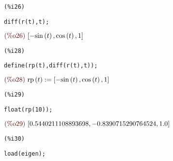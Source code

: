 \documentclass[12pt]{article}
\begin{document}
\noindent
\begin{minipage}[t]{8ex}{\color{red}\bf
\begin{verbatim}
(%i26) 
\end{verbatim}}
\end{minipage}
\begin{minipage}[t]{\textwidth}{\color{blue}
\begin{verbatim}
diff(r(t),t);
\end{verbatim}}
\end{minipage}
\begin{math}\displaystyle
\parbox{8ex}{\color{labelcolor}(\%o26) }
[-\mathrm{sin}\left( t\right) ,\mathrm{cos}\left( t\right) ,1]
\end{math}

\noindent
\begin{minipage}[t]{8ex}{\color{red}\bf
\begin{verbatim}
(%i28) 
\end{verbatim}}
\end{minipage}
\begin{minipage}[t]{\textwidth}{\color{blue}
\begin{verbatim}
define(rp(t),diff(r(t),t));
\end{verbatim}}
\end{minipage}
\begin{math}\displaystyle
\parbox{8ex}{\color{labelcolor}(\%o28) }
\mathrm{rp}\left( t\right) :=[-\mathrm{sin}\left( t\right) ,\mathrm{cos}\left( t\right) ,1]
\end{math}

\noindent
\begin{minipage}[t]{8ex}{\color{red}\bf
\begin{verbatim}
(%i29) 
\end{verbatim}}
\end{minipage}
\begin{minipage}[t]{\textwidth}{\color{blue}
\begin{verbatim}
float(rp(10));
\end{verbatim}}
\end{minipage}
\begin{math}\displaystyle
\parbox{8ex}{\color{labelcolor}(\%o29) }
[0.5440211108893698,-0.8390715290764524,1.0]
\end{math}

\noindent
\begin{minipage}[t]{8ex}{\color{red}\bf
\begin{verbatim}
(%i30) 
\end{verbatim}}
\end{minipage}
\begin{minipage}[t]{\textwidth}{\color{blue}
\begin{verbatim}
load(eigen);
\end{verbatim}}
\end{minipage}
\end{document}
